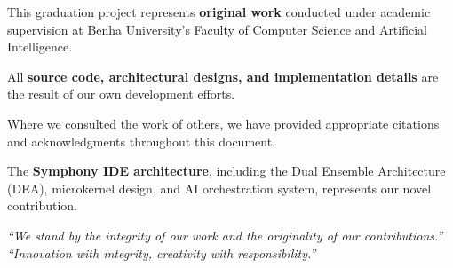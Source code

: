 \begin{compactlist}
    \item This graduation project represents \textbf{original work} conducted under academic supervision at Benha University's Faculty of Computer Science and Artificial Intelligence.
    
    \vspace{0.8em}
    
    \item All \textbf{source code, architectural designs, and implementation details} are the result of our own development efforts.
    
    \vspace{0.8em}
    
    \item Where we consulted the work of others, we have provided appropriate citations and acknowledgments throughout this document.
    
    \vspace{0.8em}
    
    \item The \textbf{Symphony IDE architecture}, including the Dual Ensemble Architecture (DEA), microkernel design, and AI orchestration system, represents our novel contribution.
    
    
    
    
\end{compactlist}

\vspace{0.8em}

\begin{center}
\textit{``We stand by the integrity of our work and the originality of our contributions.''}\\[0.2cm]
\textit{``Innovation with integrity, creativity with responsibility.''}
\end{center}

\clearpage
